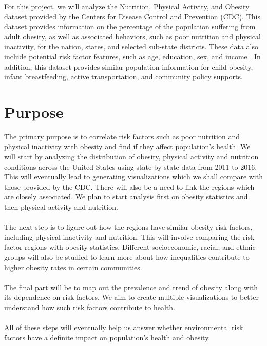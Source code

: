 \documentclass{article}
\begin{document}
For this project, we will analyze the Nutrition, Physical Activity, and Obesity dataset provided by the Centers for Disease Control and Prevention (CDC).
This dataset provides information on the percentage of the population suffering from adult obesity, as well as associated behaviors, such as poor nutrition and physical inactivity, for the nation, states, and selected sub-state districts. 
These data also include potential risk factor features, such as age, education, sex, and income \cite{nutphysactobesitydata}.
In addition, this dataset provides similar population information for child obesity, infant breastfeeding, active transportation, and community policy supports.

\section{Purpose}
\label{purpose}
The primary purpose is to correlate risk factors such as poor nutrition and physical inactivity with obesity and find if they affect population's health.
We will start by analyzing the distribution of obesity, physical activity and nutrition conditions across the United States using state-by-state data from 2011 to 2016. This will eventually lead to generating visualizations which we shall compare with those provided by the CDC. There will also be a need to link the regions which are closely associated. We plan to start analysis first on obesity statistics and then physical activity and nutrition.
\\\\
The next step is to figure out how the regions have similar obesity risk factors, including physical inactivity and nutrition.
This will involve comparing the risk factor regions with obesity statistics.
Different socioeconomic, racial, and ethnic groups will also be studied to learn more about how inequalities contribute to higher obesity rates in certain communities.
\\\\
The final part will be to map out the prevalence and trend of obesity along with its dependence on risk factors. We aim to create multiple visualizations to better understand how such risk factors contribute to health.
\\\\
All of these steps will eventually help us answer whether environmental risk factors have a definite impact on population's health and obesity.
\end{document}
